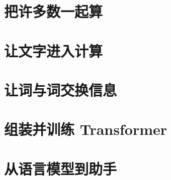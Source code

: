 \documentclass[11pt,a4paper,UTF8]{ctexart}
\numberwithin{equation}{section}
\begin{document}
\clearpage
\part{把许多数一起算}\label{part:matrices}
\partentrymatrices
\clearpage



\partexitmatrices

\clearpage
\part{让文字进入计算}\label{part:tokens}
\partentrytokens
\clearpage




\partexittokens

\clearpage
\part{让词与词交换信息}\label{part:context}
\partentrycontext
\clearpage




\partexitcontext

\clearpage
\part{组装并训练 Transformer}\label{part:transformer}
\partentrytransformer
\clearpage






\partexittransformer

\clearpage
\part{从语言模型到助手}\label{part:assistant}
\partentryassistant
\clearpage






\partexitassistant
\end{document}
